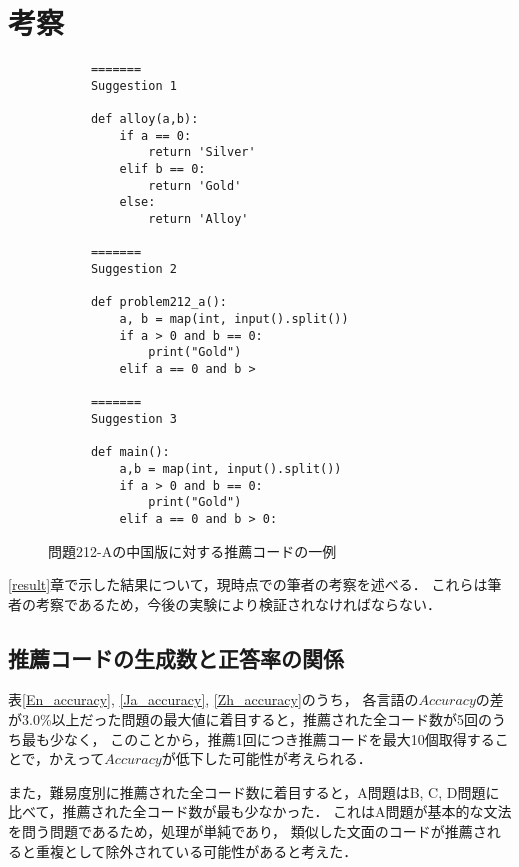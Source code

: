 \section{考察\label{discussion}}
  \begin{figure}[t]
    \begin{verbatim}
      =======
      Suggestion 1

      def alloy(a,b):
          if a == 0:
              return 'Silver'
          elif b == 0:
              return 'Gold'
          else:
              return 'Alloy'

      =======
      Suggestion 2

      def problem212_a():
          a, b = map(int, input().split())
          if a > 0 and b == 0:
              print("Gold")
          elif a == 0 and b >

      =======
      Suggestion 3

      def main():
          a,b = map(int, input().split())
          if a > 0 and b == 0:
              print("Gold")
          elif a == 0 and b > 0:
    \end{verbatim}
    \caption{問題212-Aの中国版に対する推薦コードの一例}
    \label{recommend_212_A_en}
  \end{figure}
  \ref{result}章で示した結果について，現時点での筆者の考察を述べる．
  これらは筆者の考察であるため，今後の実験により検証されなければならない．
  \vspace{-1zh}
  \subsection{推薦コードの生成数と正答率の関係}
  表\ref{En_accuracy}, \ref{Ja_accuracy}, \ref{Zh_accuracy}のうち，
  各言語の$Accuracy$の差が3.0\%以上だった問題の最大値に着目すると，推薦された全コード数が5回のうち最も少なく，
  このことから，推薦1回につき推薦コードを最大10個取得することで，かえって$Accuracy$が低下した可能性が考えられる．

  また，難易度別に推薦された全コード数に着目すると，A問題はB, C, D問題に比べて，推薦された全コード数が最も少なかった．
  これはA問題が基本的な文法を問う問題であるため，処理が単純であり，
  類似した文面のコードが推薦されると重複として除外されている可能性があると考えた．

